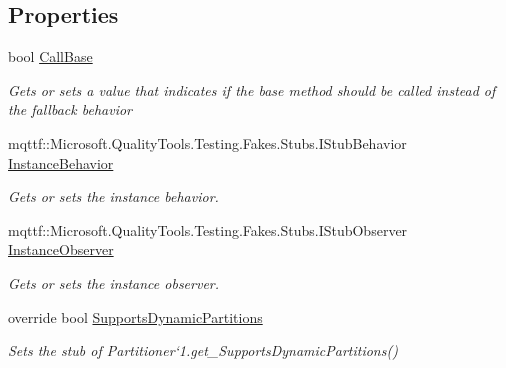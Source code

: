 \subsection*{Properties}
\begin{DoxyCompactItemize}
\item 
bool \hyperlink{class_system_1_1_collections_1_1_concurrent_1_1_fakes_1_1_stub_orderable_partitioner_3_01_t_source_01_4_a78baec7894ceb1aafd6ec6c30e1ad1c7}{Call\-Base}
\begin{DoxyCompactList}\small\item\em Gets or sets a value that indicates if the base method should be called instead of the fallback behavior\end{DoxyCompactList}\item 
mqttf\-::\-Microsoft.\-Quality\-Tools.\-Testing.\-Fakes.\-Stubs.\-I\-Stub\-Behavior \hyperlink{class_system_1_1_collections_1_1_concurrent_1_1_fakes_1_1_stub_orderable_partitioner_3_01_t_source_01_4_ac4ef6022e771d5995e032fe1bdcc9e52}{Instance\-Behavior}
\begin{DoxyCompactList}\small\item\em Gets or sets the instance behavior.\end{DoxyCompactList}\item 
mqttf\-::\-Microsoft.\-Quality\-Tools.\-Testing.\-Fakes.\-Stubs.\-I\-Stub\-Observer \hyperlink{class_system_1_1_collections_1_1_concurrent_1_1_fakes_1_1_stub_orderable_partitioner_3_01_t_source_01_4_a53303c82610333b2ec1c5f1b5267114e}{Instance\-Observer}
\begin{DoxyCompactList}\small\item\em Gets or sets the instance observer.\end{DoxyCompactList}\item 
override bool \hyperlink{class_system_1_1_collections_1_1_concurrent_1_1_fakes_1_1_stub_orderable_partitioner_3_01_t_source_01_4_a22b3f2d581edafdd2917bedb8a7352b1}{Supports\-Dynamic\-Partitions}
\begin{DoxyCompactList}\small\item\em Sets the stub of Partitioner`1.get\-\_\-\-Supports\-Dynamic\-Partitions()\end{DoxyCompactList}\end{DoxyCompactItemize}


